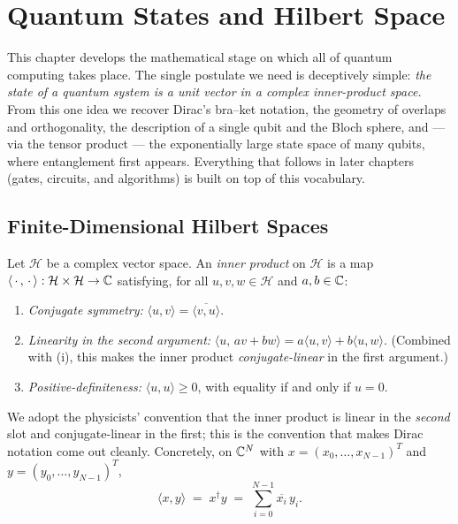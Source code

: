 \chapter{Quantum States and Hilbert Space}

\providecommand{\ketbra}[2]{\ket{#1}\!\bra{#2}}

This chapter develops the mathematical stage on which all of quantum computing
takes place. The single postulate we need is deceptively simple: \emph{the state
of a quantum system is a unit vector in a complex inner-product space.} From this
one idea we recover Dirac's bra--ket notation, the geometry of overlaps and
orthogonality, the description of a single qubit and the Bloch sphere, and --- via
the tensor product --- the exponentially large state space of many qubits, where
entanglement first appears. Everything that follows in later chapters (gates,
circuits, and algorithms) is built on top of this vocabulary.

\section{Finite-Dimensional Hilbert Spaces}

\begin{definition}\label{l1:def:inner}
Let $\mathcal{H}$ be a complex vector space. An \emph{inner product} on
$\mathcal{H}$ is a map $\langle\,\cdot\,,\,\cdot\,\rangle:\mathcal{H}\times\mathcal{H}\to\mathbb{C}$
satisfying, for all $u,v,w\in\mathcal{H}$ and $a,b\in\mathbb{C}$:
\begin{enumerate}[label=(\roman*)]
  \item \emph{Conjugate symmetry:} $\langle u,v\rangle=\overline{\langle v,u\rangle}$.
  \item \emph{Linearity in the second argument:}
        $\langle u,\,a v+b w\rangle=a\langle u,v\rangle+b\langle u,w\rangle$.
        (Combined with (i), this makes the inner product \emph{conjugate-linear}
        in the first argument.)
  \item \emph{Positive-definiteness:} $\langle u,u\rangle\ge 0$, with equality
        if and only if $u=0$.
\end{enumerate}
\end{definition}

We adopt the physicists' convention that the inner product is linear in the
\emph{second} slot and conjugate-linear in the first; this is the convention that
makes Dirac notation come out cleanly. Concretely, on $\mathbb{C}^{N}$ with
$x=(x_0,\dots,x_{N-1})^{T}$ and $y=(y_0,\dots,y_{N-1})^{T}$,
\begin{equation}
  \langle x,y\rangle \;=\; x^{\dagger}y \;=\; \sum_{i=0}^{N-1}\overline{x_i}\,y_i .
\end{equation}

